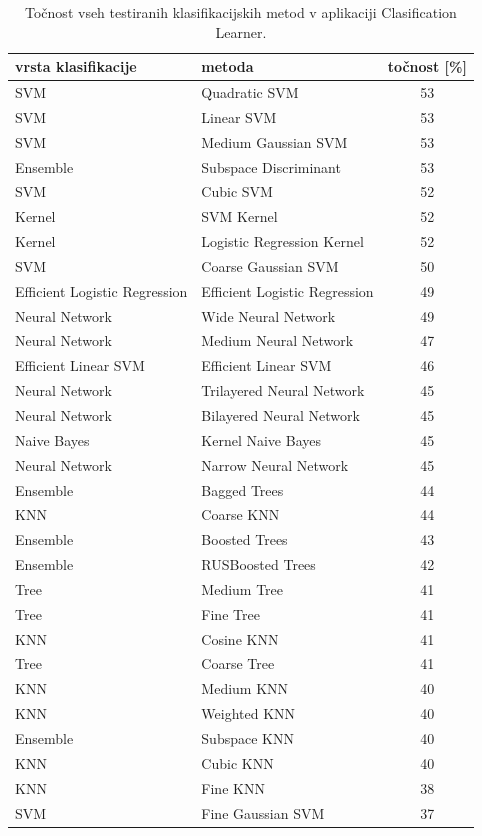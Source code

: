 \begin{table}
\centering
\begin{tabular}{|l|l|c|}
\hline
vrsta klasifikacije & metoda & točnost [\%] \\
\hline SVM&Quadratic SVM&53\\
\hline SVM&Linear SVM&53\\
\hline SVM&Medium Gaussian SVM&53\\
\hline Ensemble&Subspace Discriminant&53\\
\hline SVM&Cubic SVM&52\\
\hline Kernel&SVM Kernel&52\\
\hline Kernel&Logistic Regression Kernel&52\\
\hline SVM&Coarse Gaussian SVM&50\\
\hline Efficient Logistic Regression&Efficient Logistic Regression&49\\
\hline Neural Network&Wide Neural Network&49\\
\hline Neural Network&Medium Neural Network&47\\
\hline Efficient Linear SVM&Efficient Linear SVM&46\\
\hline Neural Network&Trilayered Neural Network&45\\
\hline Neural Network&Bilayered Neural Network&45\\
\hline Naive Bayes&Kernel Naive Bayes&45\\
\hline Neural Network&Narrow Neural Network&45\\
\hline Ensemble&Bagged Trees&44\\
\hline KNN&Coarse KNN&44\\
\hline Ensemble&Boosted Trees&43\\
\hline Ensemble&RUSBoosted Trees&42\\
\hline Tree&Medium Tree&41\\
\hline Tree&Fine Tree&41\\
\hline KNN&Cosine KNN&41\\
\hline Tree&Coarse Tree&41\\
\hline KNN&Medium KNN&40\\
\hline KNN&Weighted KNN&40\\
\hline Ensemble&Subspace KNN&40\\
\hline KNN&Cubic KNN&40\\
\hline KNN&Fine KNN&38\\
\hline SVM&Fine Gaussian SVM&37\\

\hline
\end{tabular}
\caption{Točnost vseh testiranih klasifikacijskih metod v aplikaciji Clasification Learner.}
\label{tabela:primerjava_tocnosti}
\end{table}

